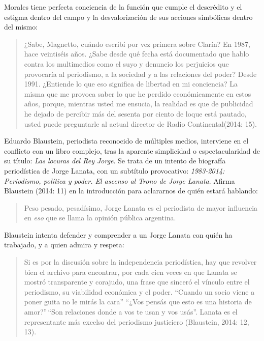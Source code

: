 Morales tiene perfecta conciencia de la función que cumple el descrédito y el estigma dentro del campo y la desvalorización de sus acciones simbólicas dentro del mismo:

\begin{quote}
¿Sabe, Magnetto, cuándo escribí por vez primera sobre Clarín? En 1987, hace veintiséis años. ¿Sabe desde qué fecha está documentado que hablo contra los multimedios como el suyo y denuncio los perjuicios que provocaría al periodismo, a la sociedad y a las relaciones del poder? Desde 1991. ¿Entiende lo que eso significa de libertad en mi conciencia? La misma que me provoca saber lo que he perdido económicamente en estos años, porque, mientras usted me ensucia, la realidad es que de publicidad he dejado de percibir más del sesenta por ciento de loque está pautado, usted puede preguntarle al actual director de Radio Continental(2014: 15).
\end{quote}

Eduardo Blaustein, periodista reconocido de múltiples medios, interviene en el conflicto con un libro complejo, tras la aparente simplicidad o espectacularidad de su título: \emph{Las locuras del Rey Jorge}. Se trata de un intento de biografía periodística de Jorge Lanata, con un subtítulo provocativo: \emph{1983-2014: Periodismo, política y poder. El ascenso al Trono de Jorge Lanata}. Afirma Blaustein (2014: 11) en la introducción para aclararnos de quién estará hablando:

\begin{quote}
Peso pesado, pesadísimo, Jorge Lanata es el periodista de mayor influencia en \emph{eso} que se llama la opinión pública argentina.
\end{quote}

Blaustein intenta defender y comprender a un Jorge Lanata con quién ha trabajado, y a quien admira y respeta:

\begin{quote}
Si es por la discusión sobre la independencia periodística, hay que revolver bien el archivo para encontrar, por cada cien veces en que Lanata se mostró transparente y corajudo, una frase que sinceró el vínculo entre el periodismo, su viabilidad económica y el poder. ``Cuando un socio viene a poner guita no le mirás la cara'' ``¿Vos pensás que esto es una historia de amor?''\,``Son relaciones donde a vos te usan y vos usás''. Lanata es el representante más excelso del periodismo justiciero (Blaustein, 2014: 12, 13).
\end{quote}

